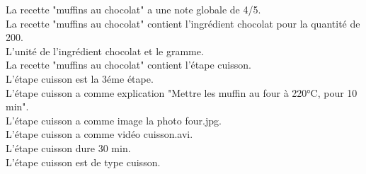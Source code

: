 \documentclass[a4paper,10pt]{article}
\begin{document}
La recette "muffins au chocolat" a une note globale de 4/5.\\
La recette "muffins au chocolat" contient l'ingrédient chocolat pour la quantité de 200.\\
L'unité de l'ingrédient chocolat et le gramme.\\
La recette "muffins au chocolat" contient l'étape cuisson.\\
L'étape cuisson est la 3éme étape.\\
L'étape cuisson a comme explication "Mettre les muffin au four à 220°C, pour 10 min".\\
L'étape cuisson a comme image la photo four.jpg.\\
L'étape cuisson a comme vidéo cuisson.avi.\\
L'étape cuisson dure 30 min.\\
L'étape cuisson est de type cuisson.\\
\end{document}
